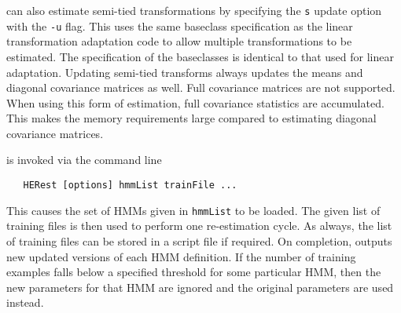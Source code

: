  can also estimate semi-tied transformations by
specifying the {\tt s} update option with the {\tt -u} flag. This uses the same baseclass
specification as the linear transformation adaptation code to allow
multiple transformations to be estimated. The specification of the
baseclasses is identical to that used for linear adaptation. Updating
semi-tied transforms always updates the means and diagonal covariance
matrices as well.  Full covariance matrices are not supported. When
using this form of estimation, full covariance statistics are
accumulated. This makes the memory requirements large compared to
estimating diagonal covariance matrices.


 is invoked via the command line
\begin{verbatim}
   HERest [options] hmmList trainFile ...
\end{verbatim}
This causes the set of HMMs given in {\tt hmmList} to be loaded.
The given list of
training files is then used to perform one re-estimation cycle. As always,
the list of training files can be stored in a script file if required.  On
completion,  outputs new updated versions of each HMM definition. If
the number of training examples falls below a specified threshold 
for some particular HMM, then
the new parameters for that HMM are ignored and the original parameters are used 
instead.

